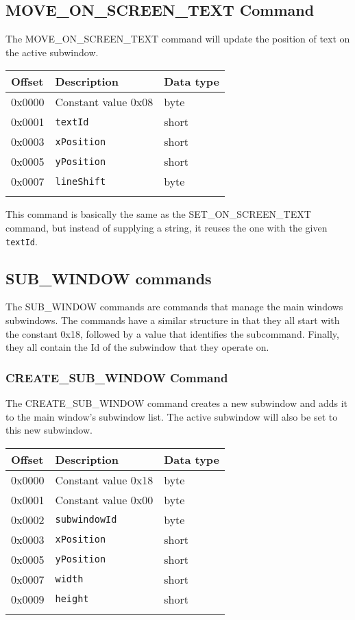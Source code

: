 \documentclass{article}
\newcommand{\field}[1]{\textcolor{fieldColor}{\texttt{#1}}}
\newenvironment{bytelisting}
{\ttfamily \begin{center} \begin{tabular}{l l l} Offset & Description & Data type \\ \hline}
{\normalfont \end{tabular} \end{center}}
\begin{document}
\subsection{MOVE\_ON\_SCREEN\_TEXT Command}
The MOVE\_ON\_SCREEN\_TEXT command will update the position of text on the active subwindow.

\begin{bytelisting}
0x0000 & Constant value 0x08 & byte \\
0x0001 & \field{textId} & short \\
0x0003 & \field{xPosition} & short \\
0x0005 & \field{yPosition} & short \\
0x0007 & \field{lineShift} & byte \\
\end{bytelisting}

This command is basically the same as the SET\_ON\_SCREEN\_TEXT command, but instead of supplying a string, it reuses the one with the given \field{textId}.

\subsection{SUB\_WINDOW commands}
The SUB\_WINDOW commands are commands that manage the main windows subwindows. The commands have a similar structure in that they all start with the constant 0x18, followed by a value that identifies
the subcommand. Finally, they all contain the Id of the subwindow that they operate on.

\subsubsection{CREATE\_SUB\_WINDOW Command}
The CREATE\_SUB\_WINDOW command creates a new subwindow and adds it to the main window's subwindow list. The active subwindow will also be set to this new subwindow.

\begin{bytelisting}
0x0000 & Constant value 0x18 & byte \\
0x0001 & Constant value 0x00 & byte \\
0x0002 & \field{subwindowId} & byte \\
0x0003 & \field{xPosition} & short \\
0x0005 & \field{yPosition} & short \\
0x0007 & \field{width} & short \\
0x0009 & \field{height} & short \\
\end{bytelisting}
\end{document}

